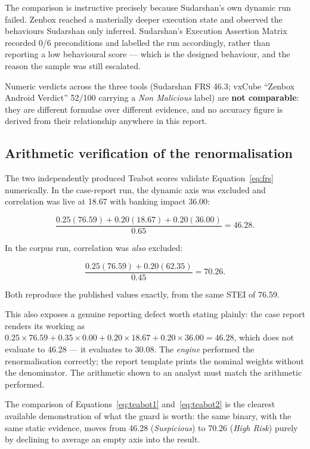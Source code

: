 \documentclass{article}
\begin{document}
The comparison is instructive precisely because Sudarshan's own dynamic run
failed. Zenbox reached a materially deeper execution state and observed the
behaviours Sudarshan only inferred. Sudarshan's Execution Assertion Matrix
recorded 0/6 preconditions and labelled the run accordingly, rather than
reporting a low behavioural score --- which is the designed behaviour, and the
reason the sample was still escalated.

Numeric verdicts across the three tools (Sudarshan FRS 46.3; vxCube ``Zenbox
Android Verdict'' 52/100 carrying a \emph{Non Malicious} label) are
\textbf{not comparable}: they are different formulae over different evidence,
and no accuracy figure is derived from their relationship anywhere in this
report.

\subsection{Arithmetic verification of the renormalisation}
\label{ssec:arith}

The two independently produced Teabot scores validate
Equation~\ref{eq:frs} numerically. In the case-report run, the dynamic axis was
excluded and correlation was live at 18.67 with banking impact 36.00:

\begin{equation}
\frac{0.25(76.59) + 0.20(18.67) + 0.20(36.00)}{0.65} = 46.28.
\label{eq:teabot1}
\end{equation}

In the corpus run, correlation was \emph{also} excluded:

\begin{equation}
\frac{0.25(76.59) + 0.20(62.35)}{0.45} = 70.26.
\label{eq:teabot2}
\end{equation}

Both reproduce the published values exactly, from the same STEI of 76.59.

This also exposes a genuine reporting defect worth stating plainly: the case
report renders its working as
$0.25 \times 76.59 + 0.35 \times 0.00 + 0.20 \times 18.67 + 0.20 \times 36.00
= 46.28$, which does not evaluate to 46.28 --- it evaluates to 30.08. The
\emph{engine} performed the renormalisation correctly; the report template
prints the nominal weights without the denominator. The arithmetic shown to an
analyst must match the arithmetic performed.

The comparison of Equations~\ref{eq:teabot1} and~\ref{eq:teabot2} is the
clearest available demonstration of what the guard is worth: the same binary,
with the same static evidence, moves from 46.28 (\emph{Suspicious}) to 70.26
(\emph{High Risk}) purely by declining to average an empty axis into the result.
\end{document}
